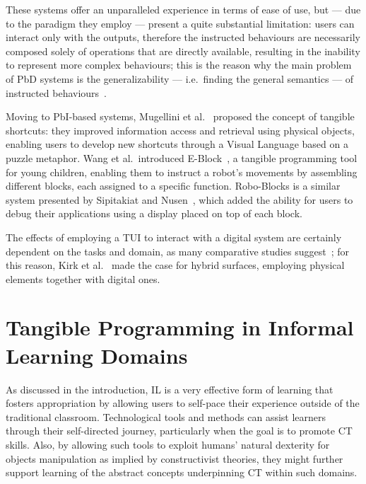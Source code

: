 These systems offer an unparalleled experience in terms of ease of use, but --- due to the paradigm they employ --- present a quite substantial limitation: users can interact only with the outputs, therefore the instructed behaviours are necessarily composed solely of operations that are directly available, resulting in the inability to represent more complex behaviours; this is the reason why the main problem of \ac{PbD} systems is the generalizability --- i.e.\ finding the general semantics --- of instructed behaviours~\cite{2001:YWM:369505}.

Moving to \ac{PbI}-based systems, Mugellini et al.~\cite{Mugellini:2009gl} proposed the concept of tangible shortcuts: they improved information access and retrieval using physical objects, enabling users to develop new shortcuts through a Visual Language based on a puzzle metaphor. Wang et al.~introduced E-Block~\cite{Wang:2012cp}, a tangible programming tool for young children, enabling them to instruct a robot's movements by assembling different blocks, each assigned to a specific function. Robo-Blocks is a similar system presented by Sipitakiat and Nusen~\cite{Sipitakiat:2012cba}, which added the ability for users to debug their applications using a display placed on top of each block.

The effects of employing a \ac{TUI} to interact with a digital system are certainly dependent on the tasks and domain, as many comparative studies suggest~\cite{Weiss:2009ct, Muller:2014kx, Hancock:2009bg}; for this reason, Kirk et al.~\cite{Kirk:2009ue} made the case for hybrid surfaces, employing physical elements together with digital ones. 

\section{Tangible Programming in Informal Learning Domains}
As discussed in the introduction, \ac{IL} is a very effective form of learning that fosters appropriation by allowing users to self-pace their experience outside of the traditional classroom. Technological tools and methods can assist learners through their self-directed journey, particularly when the goal is to promote \ac{CT} skills. Also, by allowing such tools to exploit humans' natural dexterity for objects manipulation as implied by constructivist theories, they might further support learning of the abstract concepts underpinning \ac{CT} within such domains.

